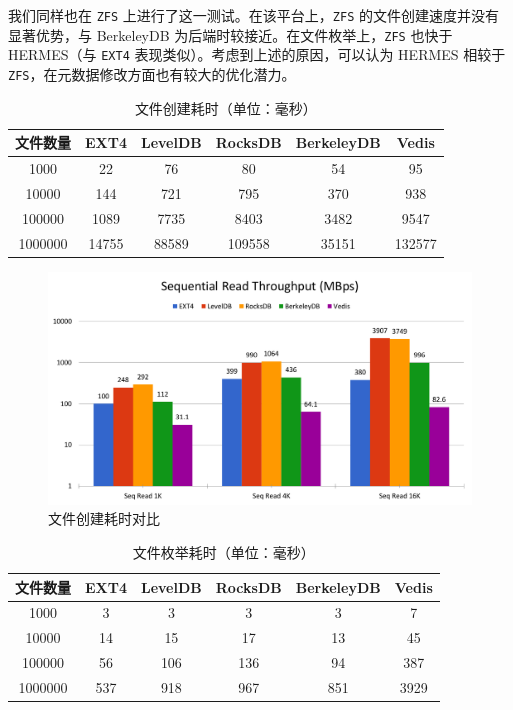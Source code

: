 \documentclass{ctexart}
\begin{document}
我们同样也在 \texttt{ZFS} 上进行了这一测试。在该平台上，\texttt{ZFS} 的文件创建速度并没有显著优势，与 BerkeleyDB 为后端时较接近。在文件枚举上，\texttt{ZFS} 也快于 HERMES（与 \texttt{EXT4} 表现类似）。考虑到上述的原因，可以认为 HERMES 相较于 \texttt{ZFS}，在元数据修改方面也有较大的优化潜力。


\begin{table}[htbp]
\centering
\caption{文件创建耗时（单位：毫秒）}
\label{tab:file-create}
\begin{tabular}{cccccc}
\hline
文件数量    & EXT4  & LevelDB & RocksDB & BerkeleyDB & Vedis  \\ \hline
1000    & 22    & 76      & 80      & 54         & 95     \\
10000   & 144   & 721     & 795     & 370        & 938    \\
100000  & 1089  & 7735    & 8403    & 3482       & 9547   \\
1000000 & 14755 & 88589   & 109558  & 35151      & 132577 \\ \hline
\end{tabular}
\end{table}

\begin{figure}[htbp]
\centering
\caption{文件创建耗时对比}
\label{fig:file-create}
\includegraphics[page=5,width=\textwidth]{HERMES_perf_plot.pdf}
\end{figure}


\begin{table}[htbp]
\centering
\caption{文件枚举耗时（单位：毫秒）}
\label{tab:file-enumerate}
\begin{tabular}{cccccc}
\hline
文件数量    & EXT4 & LevelDB & RocksDB & BerkeleyDB & Vedis \\ \hline
1000    & 3    & 3       & 3       & 3          & 7     \\
10000   & 14   & 15      & 17      & 13         & 45    \\
100000  & 56   & 106     & 136     & 94         & 387   \\
1000000 & 537  & 918     & 967     & 851        & 3929  \\ \hline
\end{tabular}
\end{table}
\end{document}
